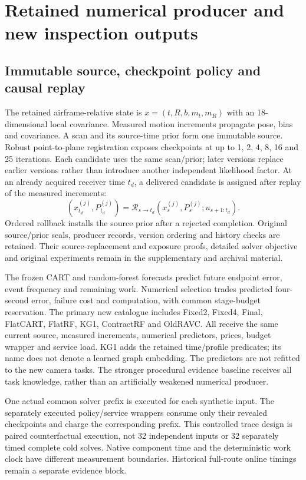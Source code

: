 \section{Retained numerical producer and new inspection outputs}\label{sec:r9-executor}
\subsection{Immutable source, checkpoint policy and causal replay}
The retained airframe-relative state is $x=(t,R,b,m_t,m_R)$ with an 18-dimensional local covariance. Measured motion increments propagate pose, bias and covariance. A scan and its source-time prior form one immutable source. Robust point-to-plane registration \cite{chen1992,pomerleau2015} exposes checkpoints at up to 1, 2, 4, 8, 16 and 25 iterations. Each candidate uses the same scan/prior; later versions replace earlier versions rather than introduce another independent likelihood factor. At an already acquired receiver time $t_d$, a delivered candidate is assigned after replay of the measured increments:
\begin{equation}
(x_{t_d}^{(j)},P_{t_d}^{(j)})=\mathcal R_{s\rightarrow t_d}(x_s^{(j)},P_s^{(j)};u_{s+1:t_d}).\label{eq:r9-replay}
\end{equation}
Ordered rollback installs the source prior after a rejected completion. Original source/prior seals, producer records, version ordering and history checks are retained. Their source-replacement and exposure proofs, detailed solver objective and original experiments remain in the supplementary and archival material.

The frozen CART and random-forest forecasts predict future endpoint error, event frequency and remaining work. Numerical selection trades predicted four-second error, failure cost and computation, with common stage-budget reservation. The primary new catalogue includes Fixed2, Fixed4, Final, FlatCART, FlatRF, KG1, ContractRF and OldRAVC. All receive the same current source, measured increments, numerical predictors, prices, budget wrapper and service load. KG1 adds the retained time/profile predicates; its name does not denote a learned graph embedding. The predictors are not refitted to the new camera tasks. The stronger procedural evidence baseline receives all task knowledge, rather than an artificially weakened numerical producer.

One actual common solver prefix is executed for each synthetic input. The separately executed policy/service wrappers consume only their revealed checkpoints and charge the corresponding prefix. This controlled trace design is paired counterfactual execution, not 32 independent inputs or 32 separately timed complete cold solves. Native component time and the deterministic work clock have different measurement boundaries. Historical full-route online timings remain a separate evidence block.


